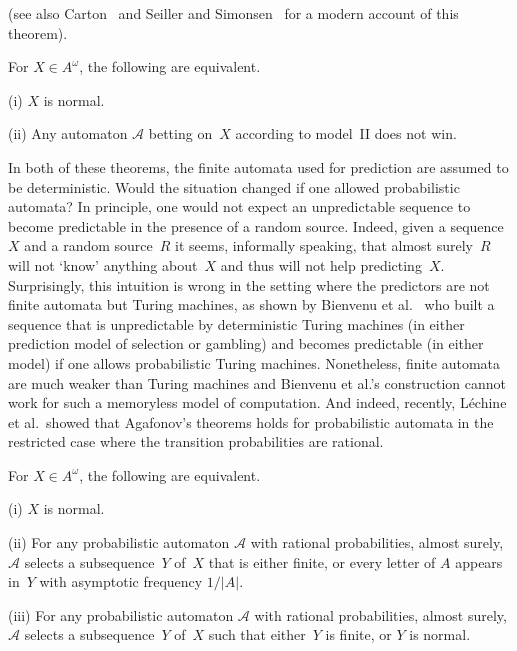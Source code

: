 \documentclass[11pt]{article}
\newcommand{\A}{\mathcal{A}}
\begin{document}
(see also Carton~\cite{Carton2020} and Seiller and Simonsen~\cite{SeillerS2020} for a modern account of this theorem). 


\begin{theorem}
For $X \in A^\omega$, the following are equivalent.
\item[(i)] $X$ is normal. 
\item[(ii)] Any automaton $\A$ betting on~$X$ according to model~II does not win. 
\end{theorem}


In both of these theorems, the finite automata used for prediction are assumed to be deterministic. Would the situation changed if one allowed probabilistic automata? In principle, one would not expect an unpredictable sequence to become predictable in the presence of a random source. Indeed, given a sequence~$X$ and a random source~$R$ it seems, informally speaking, that almost surely~$R$ will not `know' anything about~$X$ and thus will not help predicting~$X$. Surprisingly, this intuition is wrong in the setting where the predictors are not finite automata but Turing machines, as shown by Bienvenu et al.~\cite{BienvenuDS2022} who built a sequence that is unpredictable by deterministic Turing machines (in either prediction model of selection or gambling) and becomes predictable (in either model) if one allows probabilistic Turing machines. Nonetheless, finite automata are much weaker than Turing machines and Bienvenu et al.'s construction cannot work for such a memoryless model of computation. And indeed, recently, Léchine et al.\ showed that Agafonov's theorems holds for probabilistic automata in the restricted case where the transition probabilities are rational. 

\begin{theorem}
For $X \in A^\omega$, the following are equivalent.
\item[(i)] $X$ is normal. 
\item[(ii)] For any probabilistic automaton $\A$ with rational probabilities, almost surely, $\A$ selects a subsequence~$Y$ of~$X$ that is either finite, or every letter of $A$ appears in~$Y$ with asymptotic frequency $1/|A|$.
\item[(iii)] For any probabilistic automaton $\A$ with rational probabilities, almost surely, $\A$ selects a subsequence~$Y$ of~$X$ such that either~$Y$ is finite, or $Y$ is normal. 
\end{theorem}
\end{document}

